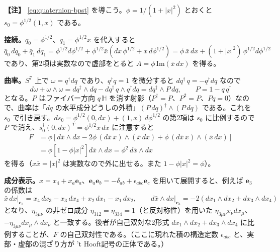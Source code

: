 \documentclass[uplatex, dvipdfmx, book]{jsbook}
\newenvironment{note}{\vspace{1ex}\par\footnotesize\noindent\textbf{【注】}}{\par\vspace{1ex}}
\begin{document}
\begin{note}
\eqref{eq:quaternion-bpst} を導こう。$\phi = 1/(1 + |x|^2)$ とおくと $s_0 = \phi^{1/2}(1, x)$ である。

\textbf{接続。}$q_0 = \phi^{1/2}$、$q_1 = \phi^{1/2}x$ を代入すると
\begin{equation*}
    \bar{q}_0\, dq_0 + \bar{q}_1\, dq_1 = \phi^{1/2} d\phi^{1/2} + \phi^{1/2}\bar{x}\left( dx\, \phi^{1/2} + x\, d\phi^{1/2} \right) = \phi\, \bar{x}\,dx + (1 + |x|^2)\,\phi^{1/2}d\phi^{1/2}
\end{equation*}
であり、第2項は実数なので虚部をとると $A = \phi\,\mathrm{Im}(\bar{x}\,dx)$ を得る。

\textbf{曲率。}$S^7$ 上で $\omega = q^\dagger dq$ であり、$q^\dagger q = 1$ を微分すると $dq^\dagger\, q = -q^\dagger dq$ なので
\begin{equation*}
    d\omega + \omega \wedge \omega = dq^\dagger \wedge dq - dq^\dagger\, q \wedge q^\dagger dq = dq^\dagger \wedge P\, dq, \qquad P = 1 - q\, q^\dagger
\end{equation*}
となる。$P$ はファイバー方向 $q\,\mathbb{H}$ を消す射影（$P^\dagger = P$、$P^2 = P$、$Pq = 0$）なので、曲率は「$dq$ の水平成分どうしの外積」$(P\,dq)^\dagger \wedge (P\,dq)$ である。これを $s_0$ で引き戻す。$ds_0 = \phi^{1/2}(0, dx) + (1, x)\,d\phi^{1/2}$ の第2項は $s_0$ に比例するので $P$ で消え、$s_0^\dagger (0, dx)^T = \phi^{1/2}\bar{x}\,dx$ に注意すると
\begin{align*}
    F &= \phi \left[ d\bar{x} \wedge dx - 2\phi\, (d\bar{x}\,x) \wedge (\bar{x}\,dx) + \phi\, (d\bar{x}\,x) \wedge (\bar{x}\,dx) \right] \\
      &= \phi \left[ 1 - \phi|x|^2 \right] d\bar{x} \wedge dx = \phi^2\, d\bar{x} \wedge dx
\end{align*}
を得る（$x\bar{x} = |x|^2$ は実数なので外に出せる。また $1 - \phi|x|^2 = \phi$）。

\textbf{成分表示。}$x = x_4 + x_a\bm{e}_a$、$\bm{e}_a\bm{e}_b = -\delta_{ab} + \epsilon_{abc}\bm{e}_c$ を用いて展開すると、例えば $\bm{e}_3$ の係数は
\begin{equation*}
    \bar{x}\,dx\big|_{\bm{e}_3} = x_4\, dx_3 - x_3\, dx_4 + x_2\, dx_1 - x_1\, dx_2, \qquad d\bar{x} \wedge dx\big|_{\bm{e}_3} = -2\left( dx_1 \wedge dx_2 + dx_3 \wedge dx_4 \right)
\end{equation*}
となり、$\eta_{3\mu\nu}$ の非ゼロ成分 $\eta_{312} = \eta_{334} = 1$（と反対称性）を用いた $\eta_{3\mu\nu}x_\nu dx_\mu$、$-\eta_{3\mu\nu}dx_\mu \wedge dx_\nu$ と一致する。後者が自己双対な2形式 $dx_1 \wedge dx_2 + dx_3 \wedge dx_4$ に比例することが、$F$ の自己双対性である。（ここに現れた積の構造定数 $\epsilon_{abc}$ と、実部・虚部の混ざり方が 't Hooft記号の正体である。）
\end{note}
\end{document}
